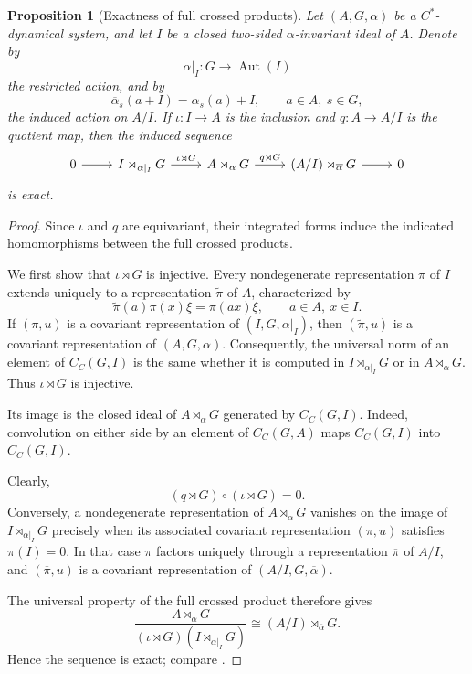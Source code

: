 \documentclass{book}
\newtheorem{proposition}[definition]{Proposition}
\begin{document}
\begin{proposition}[Exactness of full crossed products]
  \label{prop:exactness-full-crossed-products}
  Let \((A,G,\alpha)\) be a \(C^*\)-dynamical system, and let
  \(I\) be a closed two-sided \(\alpha\)-invariant ideal of \(A\).
  Denote by
  \[
    \alpha|_I:G\longrightarrow\operatorname{Aut}(I)
  \]
  the restricted action, and by
  \[
    \overline{\alpha}_s(a+I)
      =\alpha_s(a)+I,
    \qquad a\in A,\ s\in G,
  \]
  the induced action on \(A/I\). If
  \(\iota:I\to A\) is the inclusion and
  \(q:A\to A/I\) is the quotient map, then the induced sequence
  \[
    \begin{tikzcd}
      0\arrow[r]
      &I\rtimes_{\alpha|_I}G
        \arrow[r,"\iota\rtimes G"]
      &A\rtimes_\alpha G
        \arrow[r,"q\rtimes G"]
      &(A/I)\rtimes_{\overline{\alpha}}G
        \arrow[r]
      &0
    \end{tikzcd}
  \]
  is exact.
\end{proposition}

\begin{proof}
  Since \(\iota\) and \(q\) are equivariant, their integrated forms
  induce the indicated homomorphisms between the full crossed
  products.

  We first show that \(\iota\rtimes G\) is injective. Every
  nondegenerate representation \(\pi\) of \(I\) extends uniquely to a
  representation \(\widetilde{\pi}\) of \(A\), characterized by
  \[
    \widetilde{\pi}(a)\pi(x)\xi
      =\pi(ax)\xi,
    \qquad
    a\in A,\ x\in I.
  \]
  If \((\pi,u)\) is a covariant representation of
  \((I,G,\alpha|_I)\), then \((\widetilde{\pi},u)\) is a covariant
  representation of \((A,G,\alpha)\). Consequently, the universal
  norm of an element of \(C_C(G,I)\) is the same whether it is
  computed in \(I\rtimes_{\alpha|_I}G\) or in
  \(A\rtimes_\alpha G\). Thus \(\iota\rtimes G\) is injective.

  Its image is the closed ideal of \(A\rtimes_\alpha G\) generated
  by \(C_C(G,I)\). Indeed, convolution on either side by an element
  of \(C_C(G,A)\) maps \(C_C(G,I)\) into \(C_C(G,I)\).

  Clearly,
  \[
    (q\rtimes G)\circ(\iota\rtimes G)=0.
  \]
  Conversely, a nondegenerate representation of
  \(A\rtimes_\alpha G\) vanishes on the image of
  \(I\rtimes_{\alpha|_I}G\) precisely when its associated covariant
  representation \((\pi,u)\) satisfies \(\pi(I)=0\). In that case
  \(\pi\) factors uniquely through a representation
  \(\overline{\pi}\) of \(A/I\), and
  \((\overline{\pi},u)\) is a covariant representation of
  \((A/I,G,\overline{\alpha})\).

  The universal property of the full crossed product therefore gives
  \[
    \frac{A\rtimes_\alpha G}
         {(\iota\rtimes G)
          (I\rtimes_{\alpha|_I}G)}
    \cong
    (A/I)\rtimes_{\overline{\alpha}}G.
  \]
  Hence the sequence is exact; compare
  \cite[Proposition~3.19]{Williams2007}.
\end{proof}
\end{document}
